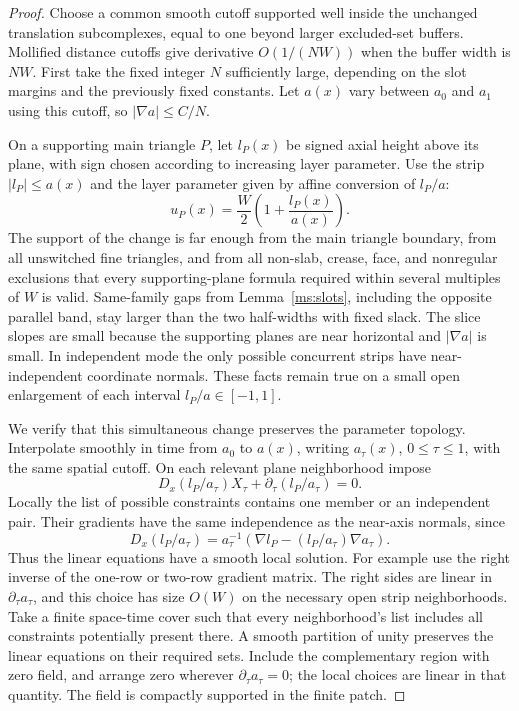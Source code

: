 \documentclass[11pt]{article}
\numberwithin{equation}{section}
\theoremstyle{definition}
\theoremstyle{remark}
\begin{document}
\begin{proof}
Choose a common smooth cutoff supported well inside the unchanged
translation subcomplexes, equal to one beyond larger excluded-set
buffers.  Mollified distance cutoffs give derivative
$O(1/(NW))$ when the buffer width is $NW$.  First take the fixed
integer $N$ sufficiently large, depending on the slot margins and
the previously fixed constants.  Let $a(x)$ vary between $a_0$
and $a_1$ using this cutoff, so $|\nabla a|\le C/N$.

On a supporting main triangle $P$, let $l_P(x)$ be signed axial
height above its plane, with sign chosen according to increasing
layer parameter.  Use the strip $|l_P|\le a(x)$ and the layer
parameter given by affine conversion of $l_P/a$:
\begin{equation}
 u_P(x)=\frac W2\left(1+\frac{l_P(x)}{a(x)}\right).
 \label{ms:wide-parameter}
\end{equation}
The support of the change is far enough from the main triangle
boundary, from all unswitched fine triangles, and from all
non-slab, crease, face, and nonregular exclusions that every
supporting-plane formula required within several multiples of
$W$ is valid.  Same-family gaps from Lemma~\ref{ms:slots}, including
the opposite parallel band, stay larger than the two half-widths
with fixed slack.  The slice slopes are small because the
supporting planes are near horizontal and $|\nabla a|$ is small.
In independent mode the only possible concurrent strips have
near-independent coordinate normals.  These facts remain true
on a small open enlargement of each interval
$l_P/a\in[-1,1]$.

We verify that this simultaneous change preserves the parameter
topology.  Interpolate smoothly in time from $a_0$ to $a(x)$,
writing $a_\tau(x)$, $0\le\tau\le1$, with the same spatial
cutoff.  On each relevant plane neighborhood impose
\begin{equation}
 D_x(l_P/a_\tau)X_\tau
       +\partial_\tau(l_P/a_\tau)=0.
 \label{ms:material}
\end{equation}
Locally the list of possible constraints contains one member or
an independent pair.  Their gradients have the same independence
as the near-axis normals, since
\[
 D_x(l_P/a_\tau)
   =a_\tau^{-1}
       \left(\nabla l_P-(l_P/a_\tau)\nabla a_\tau\right).
\]
Thus the linear equations have a smooth local solution.  For
example use the right inverse of the one-row or two-row gradient
matrix.  The right sides are linear in $\partial_\tau a_\tau$,
and this choice has size $O(W)$ on the necessary open strip
neighborhoods.  Take a finite space-time cover such that every
neighborhood's list includes all constraints potentially present
there.  A smooth partition of unity preserves the linear
equations on their required sets.  Include the complementary
region with zero field, and arrange zero wherever
$\partial_\tau a_\tau=0$; the local choices are linear in that
quantity.  The field is compactly supported in the finite patch.


\end{proof}
\end{document}
